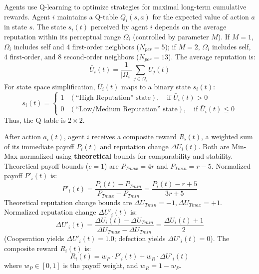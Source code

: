 \documentclass[preprint,number,sort&compress,12pt]{elsarticle}
\begin{document}
Agents use Q-learning to optimize strategies for maximal long-term cumulative rewards. Agent $i$ maintains a Q-table $Q_i(s, a)$ for the expected value of action $a$ in state $s$. The state $s_i(t)$ perceived by agent $i$ depends on the average reputation within its perceptual range $\Omega_i$ (controlled by parameter $M$). If $M=1$, $\Omega_i$ includes self and 4 first-order neighbors ($N_{per} = 5$); if $M=2$, $\Omega_i$ includes self, 4 first-order, and 8 second-order neighbors ($N_{per} = 13$). The average reputation is:
\begin{equation}
\bar{U}_i(t) = \frac{1}{|\Omega_i|} \sum_{j \in \Omega_i} U_j(t)
\label{eq:rep_avg_model_restored}
\end{equation}
For state space simplification, $\bar{U}_i(t)$ maps to a binary state $s_i(t)$:
\begin{equation}
s_i(t) =
\begin{cases}
1 & (\text{``High Reputation'' state}), \quad \text{if } \bar{U}_i(t) > 0 \\
0 & (\text{``Low/Medium Reputation'' state}), \quad \text{if } \bar{U}_i(t) \le 0
\end{cases}
\label{eq:rep_state_model_restored}
\end{equation}
Thus, the Q-table is $2 \times 2$.

After action $a_i(t)$, agent $i$ receives a composite reward $R_i(t)$, a weighted sum of its immediate payoff $P_i(t)$ and reputation change $\Delta U_i(t)$. Both are Min-Max normalized using \textbf{theoretical} bounds for comparability and stability. Theoretical payoff bounds ($c=1$) are $P_{Tmax} = 4r$ and $P_{Tmin} = r - 5$. Normalized payoff $P'_i(t)$ is:
\begin{equation}
P'_i(t) = \frac{P_i(t) - P_{Tmin}}{P_{Tmax} - P_{Tmin}} = \frac{P_i(t) - r + 5}{3r + 5}
\label{eq:payoff_norm_theory_original_restored}
\end{equation}
Theoretical reputation change bounds are $\Delta U_{Tmin} = -1, \Delta U_{Tmax} = +1$. Normalized reputation change $\Delta U'_i(t)$ is:
\begin{equation}
\Delta U'_i(t) = \frac{\Delta U_i(t) - \Delta U_{Tmin}}{\Delta U_{Tmax} - \Delta U_{Tmin}} = \frac{\Delta U_i(t) + 1}{2}
\label{eq:rep_change_norm_theory_model_restored}
\end{equation}
(Cooperation yields $\Delta U'_i(t)=1.0$; defection yields $\Delta U'_i(t)=0$). The composite reward $R_i(t)$ is:
\begin{equation}
R_i(t) = w_P \cdot P'_i(t) + w_R \cdot \Delta U'_i(t)
\label{eq:reward_model_normalized_theory_restored}
\end{equation}
where $w_P \in [0, 1]$ is the payoff weight, and $w_R = 1 - w_P$.
\end{document}
